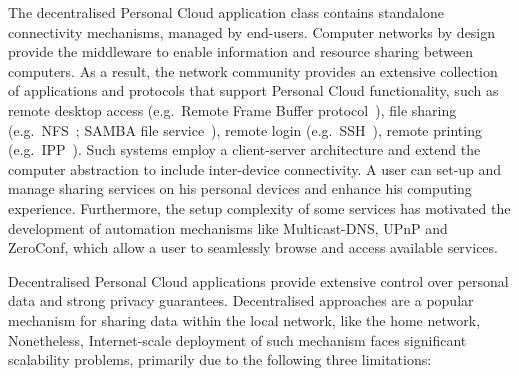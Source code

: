 The decentralised Personal Cloud application class contains standalone
connectivity mechanisms, managed by end-users.  Computer networks by design 
provide the middleware to enable information and resource sharing between
computers. As a result, the network community provides an extensive collection
of applications and protocols that support Personal Cloud functionality, such as
remote desktop access (e.g.~Remote Frame Buffer protocol~), file
sharing (e.g.~NFS~; SAMBA file service~), remote login
(e.g.~SSH~), remote printing (e.g.~IPP~).
Such systems employ a client-server architecture and extend the computer
abstraction to include inter-device connectivity.  A user can set-up and manage
sharing services on his personal devices and enhance his computing experience.
Furthermore, the setup complexity of some services has motivated the
development of automation mechanisms like Multicast-DNS, UPnP and ZeroConf,
which allow a user to seamlessly browse and access available services. 

Decentralised Personal Cloud applications provide extensive control over
personal data and strong privacy guarantees. Decentralised approaches are a
popular mechanism for sharing data  within the local network, like the home
network, Nonetheless, Internet-scale deployment of such mechanism faces
significant scalability problems, primarily due to the following three limitations:

